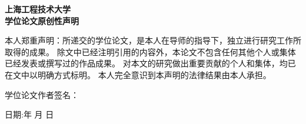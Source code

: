 \begin{center}
    \heiti\sanhao\textbf{
        上海工程技术大学\\
        学位论文原创性声明}
\end{center}

\vspace{3em}

本人郑重声明：所递交的学位论文，是本人在导师的指导下，独立进行研究工作所取得的成果。
除文中已经注明引用的内容外，本论文不包含任何其他个人或集体已经发表或撰写过的作品成果。
对本文的研究做出重要贡献的个人和集体，均已在文中以明确方式标明。
本人完全意识到本声明的法律结果由本人承担。

\vspace{10em}

\begin{flushright}

    学位论文作者签名：\hspace{4em}
    \vspace{1em}

    日期:\qquad\quad 年 \qquad 月 \qquad 日

\end{flushright}

\newpage
